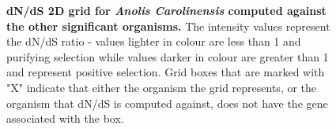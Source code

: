 \documentclass{article}
\begin{document}
\begin{figure}[H]
\centering
{}
\caption{\textbf{dN/dS 2D grid for \textit{Anolis Carolinensis} computed against the other significant organisms.} The intensity values represent the dN/dS ratio - values lighter in colour are less than 1 and purifying selection while values darker in colour are greater than 1 and represent positive selection. Grid boxes that are marked with "X" indicate that either the organism the grid represents, or the organism that dN/dS is computed against, does not have the gene associated with the box.}
\label{sup_fig_20}
\end{figure}
\end{document}
